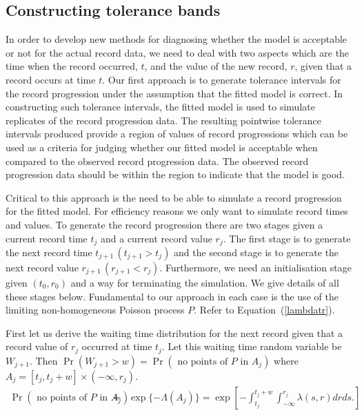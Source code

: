 \documentclass[10pt]{article}
\begin{document}
\subsection{Constructing tolerance bands}


In order to develop new methods for diagnosing whether the model 
is acceptable or not for the actual record data, we need to deal
with two aspects which are the time when the record occurred, $t$, and the
value of the new record, $r$,  given that a record occurs at time $t$.
Our first approach is to generate tolerance intervals for the record
progression under the assumption that the fitted model is correct.
In constructing such tolerance intervals, the fitted model is used 
to simulate replicates of the record progression data. 
The resulting pointwise tolerance intervals produced provide 
a region of values of record progressions which 
can be used as a criteria for judging whether our fitted model
is acceptable when compared to the observed record progression data. 
The observed record progression data
should be within the region to indicate that the model is good. 

Critical to this approach is the need to be able to simulate a
record progression for the fitted model. For efficiency reasons we
only want to simulate record times and values.  To
generate the record progression there are two stages given a current
record time $t_j$ and a current record value $r_j$.  The first stage is
to generate the next record time $t_{j+1} \,(t_{j+1}>t_j)$ 
and the second stage is to generate the next record value 
$r_{j+1} \,(r_{j+1}<r_j)$. Furthermore, we need an initialisation stage 
given $(t_0,r_0)$ and a way for terminating the simulation.
We give details of all these stages below. 
Fundamental to our approach in each case is the use of the limiting
non-homogeneous Poisson process $P$. Refer to Equation~(\ref{lambdatr}).

First let us derive the waiting time distribution for the next record
given that a record value of $r_j$ occurred at time $t_j$. Let  this
waiting time random variable be $W_{j+1}$. Then
$
\Pr(W_{j+1}>w)=\Pr( \mbox{ no points of $P$ in }A_j) 
$
where $A_j = [t_j,t_j+w] \times (-\infty,r_j)$. 
\begin{eqnarray*}
  \Pr(\mbox{ no points of $P$ in }A_j) 
& = & \exp\{-\Lambda(A_j)\}  =  \exp
  \left[-\int^{t_{j}+w}_{t_j}\int^{r_j}_{-\infty}\lambda(s,r)drds.
  \right]
\end{eqnarray*}
\end{document}
